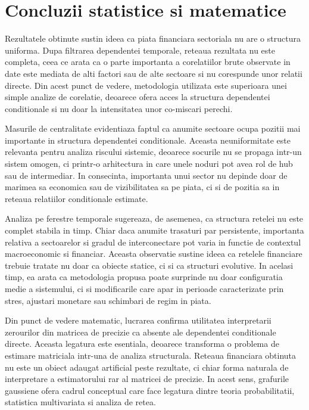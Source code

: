\section{Concluzii statistice si matematice}

Rezultatele obtinute sustin ideea ca piata financiara sectoriala nu are o
structura uniforma. Dupa filtrarea dependentei temporale, reteaua rezultata nu
este completa, ceea ce arata ca o parte importanta a corelatiilor brute observate
in date este mediata de alti factori sau de alte sectoare si nu corespunde unor
relatii directe. Din acest punct de vedere, metodologia utilizata este superioara
unei simple analize de corelatie, deoarece ofera acces la structura dependentei
conditionale si nu doar la intensitatea unor co-miscari perechi.

Masurile de centralitate evidentiaza faptul ca anumite sectoare ocupa pozitii
mai importante in structura dependentei conditionale. Aceasta neuniformitate
este relevanta pentru analiza riscului sistemic, deoarece socurile nu se
propaga intr-un sistem omogen, ci printr-o arhitectura in care unele noduri
pot avea rol de hub sau de intermediar. In consecinta, importanta unui sector
nu depinde doar de marimea sa economica sau de vizibilitatea sa pe piata, ci
si de pozitia sa in reteaua relatiilor conditionale estimate.

Analiza pe ferestre temporale sugereaza, de asemenea, ca structura retelei nu
este complet stabila in timp. Chiar daca anumite trasaturi par persistente,
importanta relativa a sectoarelor si gradul de interconectare pot varia in
functie de contextul macroeconomic si financiar. Aceasta observatie sustine
ideea ca retelele financiare trebuie tratate nu doar ca obiecte statice, ci
si ca structuri evolutive. In acelasi timp, ea arata ca metodologia propusa
poate surprinde nu doar configuratia medie a sistemului, ci si modificarile
care apar in perioade caracterizate prin stres, ajustari monetare sau schimbari
de regim in piata.

Din punct de vedere matematic, lucrarea confirma utilitatea interpretarii
zerourilor din matricea de precizie ca absente ale dependentei conditionale
directe. Aceasta legatura este esentiala, deoarece transforma o problema de
estimare matriciala intr-una de analiza structurala. Reteaua financiara obtinuta
nu este un obiect adaugat artificial peste rezultate, ci chiar forma naturala
de interpretare a estimatorului rar al matricei de precizie. In acest sens,
grafurile gaussiene ofera cadrul conceptual care face legatura dintre teoria
probabilitatii, statistica multivariata si analiza de retea.

